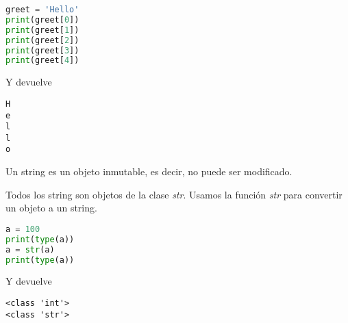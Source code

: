     \begin{lstlisting}[language = {python}]
greet = 'Hello'
print(greet[0])
print(greet[1])
print(greet[2])
print(greet[3])
print(greet[4])
    \end{lstlisting}
    Y devuelve
    \begin{lstlisting}[language = {[latex]tex}]
H
e
l
l
o
    \end{lstlisting}
    Un string es un objeto inmutable, es decir, no puede ser modificado.\par 
    Todos los string son objetos de la clase \emph{str}. Usamos la función \emph{str} para convertir un objeto a un string.
    \begin{lstlisting}[language = {python}]
a = 100
print(type(a))
a = str(a)
print(type(a))
    \end{lstlisting}
    Y devuelve
    \begin{lstlisting}[language = {[latex]tex}]
<class 'int'>
<class 'str'>
    \end{lstlisting}

